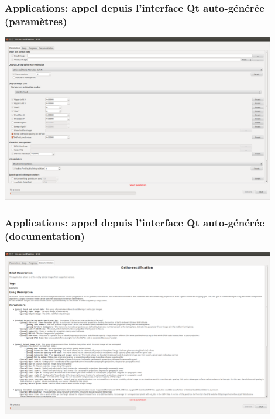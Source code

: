 \documentclass[8pt]{beamer}
\begin{document}
\begin{frame}[fragile]
\frametitle{Applications: appel depuis l'interface Qt auto-générée (paramètres)}
\begin{center}
\includegraphics[width=0.9\textwidth]{images/app_parameters.png}
\end{center}
\end{frame}


\begin{frame}[fragile]
\frametitle{Applications: appel depuis l'interface Qt auto-générée (documentation)}
\begin{center}
\includegraphics[width=0.9\textwidth]{images/app_doc.png}
\end{center}
\end{frame}
\end{document}
